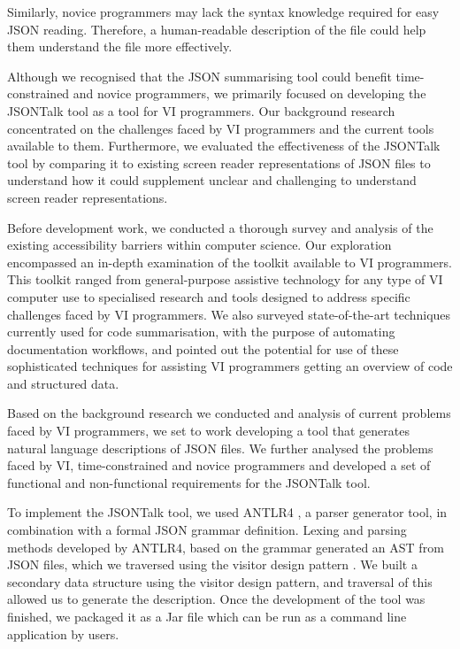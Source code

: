 \documentclass{l4proj}
\begin{document}
Similarly, novice programmers may lack the syntax knowledge required for easy JSON reading. Therefore, a human-readable description of the file could help them understand the file more effectively.

Although we recognised that the JSON summarising tool could benefit time-constrained and novice programmers, we primarily focused on developing the JSONTalk tool as a tool for VI programmers. Our background research concentrated on the challenges faced by VI programmers and the current tools available to them. Furthermore, we evaluated the effectiveness of the JSONTalk tool by comparing it to existing screen reader representations of JSON files to understand how it could supplement unclear and challenging to understand screen reader representations.

Before development work, we conducted a thorough survey and analysis of the existing accessibility barriers within computer science. Our exploration encompassed an in-depth examination of the toolkit available to VI programmers. This toolkit ranged from general-purpose assistive technology for any type of VI computer use to specialised research and tools designed to address specific challenges faced by VI programmers.
We also surveyed state-of-the-art techniques currently used for code summarisation, with the purpose of automating documentation workflows, and pointed out the potential for use of these sophisticated techniques for assisting VI programmers getting an overview of code and structured data.

Based on the background research we conducted and analysis of current problems faced by VI programmers, we set to work developing a tool that generates natural language descriptions of JSON files. We further analysed the problems faced by VI, time-constrained and novice programmers and developed a set of functional and non-functional requirements for the JSONTalk tool. 

To implement the JSONTalk tool, we used ANTLR4 \cite{antlr4}, a parser generator tool, in combination with a formal JSON grammar definition. Lexing and parsing methods developed by ANTLR4, based on the grammar generated an AST from JSON files, which we traversed using the visitor design pattern \cite{hunt2013gang}. We built a secondary data structure using the visitor design pattern, and traversal of this allowed us to generate the description. Once the development of the tool was finished, we packaged it as a Jar file which can be run as a command line application by users.
\end{document}
